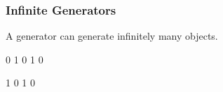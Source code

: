 \begin{comment}
<<Generator>>=
g1: Generator I := generate {yield 4; yield 2}
g2: Generator I := generate {for i in g1 repeat {
    yield i; yield 0
}}
for i in g2 repeat stdout << i << space
map(f: I -> List I, g: Generator I): Generator List I == {
  f i for i in g  
}
f1(n: I): List I == [n]
f2(n: I): List I == [0 for i in 1..n]
ll: List List I := [map(f1, g1)]
[map(f1, generator l)]
[map(f2, generator a)]
@
\end{comment}



















\begin{frame}[fragile]
  \frametitle<presentation>{Infinite Generators}

A generator can generate infinitely many objects.
\begin{myverbatim}

0 1 0 1 0

1 0 1 0
\end{myverbatim}
\end{frame}
\begin{comment}
<<Generator>>=
g1 := generate repeat {yield 0; yield 1}
for k in 1..5 for i in g1 repeat stdout << i << space
for k in l    for i in g1 repeat stdout << i << space
#quit
@
\end{comment}































